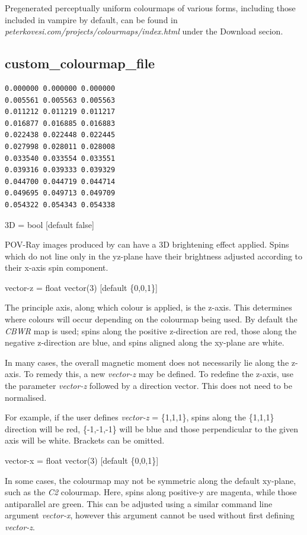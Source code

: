 Pregenerated perceptually uniform colourmaps of various forms, including those included in vampire by default, can be found in \textit{peterkovesi.com/projects/\newline colourmaps/index.html} under the Download secion.

\subsection*{custom\_colourmap\_file}
{\footnotesize
\begin{verbatim}
0.000000 0.000000 0.000000
0.005561 0.005563 0.005563
0.011212 0.011219 0.011217
0.016877 0.016885 0.016883
0.022438 0.022448 0.022445
0.027998 0.028011 0.028008
0.033540 0.033554 0.033551
0.039316 0.039333 0.039329
0.044700 0.044719 0.044714
0.049695 0.049713 0.049709
0.054322 0.054343 0.054338
\end{verbatim}
}

{\zicf 3D = bool [default false]} POV-Ray images produced by \vdc can have a 3D brightening effect applied. Spins which do not line only in the yz-plane have their brightness adjusted according to their x-axis spin component.

{\zicf vector-z = float vector(3) [default \{0,0,1\}]} The principle axis, along which colour is applied, is the z-axis. This determines where colours will occur depending on the colourmap being used. By default the \textit{CBWR} map is used; spins along the positive z-direction are red, those along the negative z-direction are blue, and spins aligned along the xy-plane are white.

In many cases, the overall magnetic moment does not necessarily lie along the z-axis. To remedy this, a new \textit{vector-z} may be defined. To redefine the z-axis, use the parameter \textit{vector-z} followed by a direction vector. This does not need to be normalised.

For example, if the user defines \textit{vector-z} = \{1,1,1\}, spins along the \{1,1,1\} direction will be red, \{-1,-1,-1\} will be blue and those perpendicular to the given axis will be white. Brackets can be omitted.

{\zicf vector-x = float vector(3) [default \{0,0,1\}]} In some cases, the colourmap may not be symmetric along the default xy-plane, such as the \textit{C2} colourmap. Here, spins along positive-y are magenta, while those antiparallel are green. This can be adjusted using a similar command line argument \textit{vector-x}, however this argument cannot be used without first defining \textit{vector-z}. 

